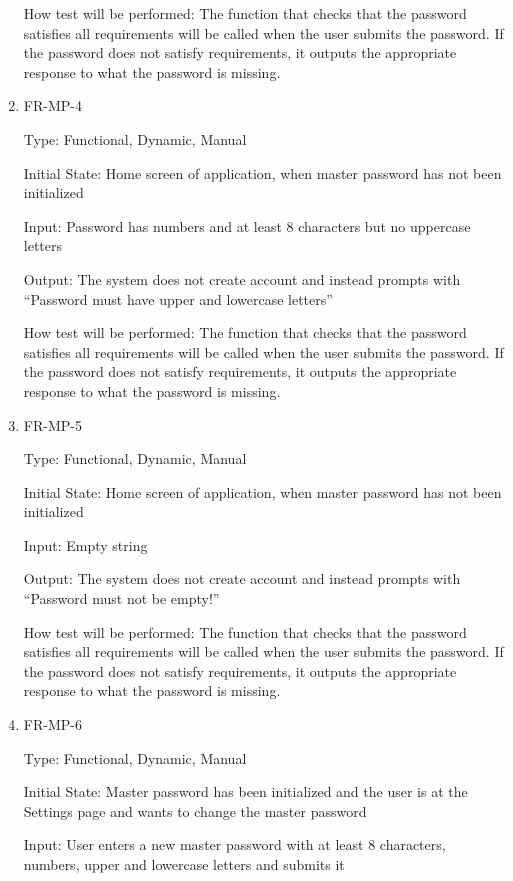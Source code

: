 \documentclass[12pt, titlepage]{article}
\begin{document}
\begin{enumerate}
How test will be performed: The function that checks that the password satisfies all requirements will be called when the user submits the password. If the password does not satisfy requirements, it outputs the appropriate response to what the password is missing.

\item{FR-MP-4\\}

Type: Functional, Dynamic, Manual

Initial State: Home screen of application, when master password has not been initialized 

Input: Password has numbers and at least 8 characters but no uppercase letters

Output: The system does not create account and instead prompts with “Password must have upper and lowercase letters”

How test will be performed: The function that checks that the password satisfies all requirements will be called when the user submits the password. If the password does not satisfy requirements, it outputs the appropriate response to what the password is missing.

\item{FR-MP-5\\}

Type: Functional, Dynamic, Manual

Initial State: Home screen of application, when master password has not been initialized 

Input: Empty string

Output: The system does not create account and instead prompts with “Password must not be empty!”

How test will be performed: The function that checks that the password satisfies all requirements will be called when the user submits the password. If the password does not satisfy requirements, it outputs the appropriate response to what the password is missing.

\item{FR-MP-6\\}

Type: Functional, Dynamic, Manual

Initial State: Master password has been initialized and the user is at the Settings page and wants to change the master password

Input: User enters a new master password with at least 8 characters, numbers, upper and lowercase letters and submits it


\end{enumerate}
\end{document}
